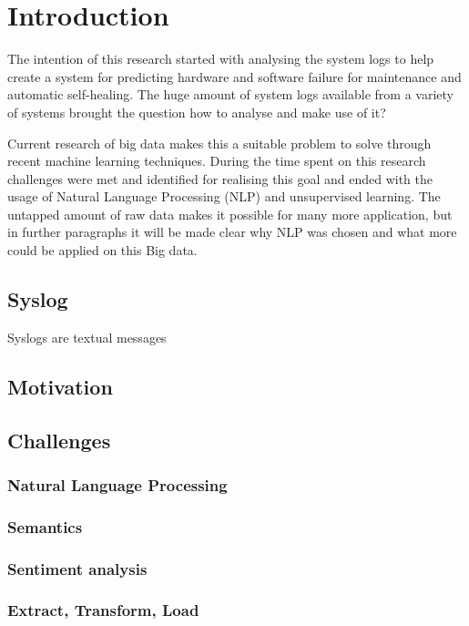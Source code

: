 \chapter{Introduction} \label{ch:introduction}
The intention of this research started with analysing the system logs to help create a system for predicting hardware and software failure for maintenance and automatic self-healing. The huge amount of system logs available from a variety of systems brought the question how to analyse and make use of it? 

Current research of big data makes this a suitable problem to solve through recent machine learning techniques. 
During the time spent on this research challenges were met and identified for realising this goal and ended with the usage of Natural Language Processing (NLP) and unsupervised learning.  The untapped amount of raw data makes it possible for many more application, but in further paragraphs it will be made clear why NLP was chosen and what more could be applied on this Big data. 
 
 
\section{Syslog} 
Syslogs are textual messages \cite{Stearley2004TowardsSyslogs}

\section{Motivation}


\section{Challenges}

\subsection{Natural Language Processing}


\subsection{Semantics}


\subsection{Sentiment analysis}


\subsection{Extract, Transform, Load}


